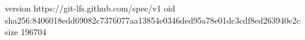 version https://git-lfs.github.com/spec/v1
oid sha256:8406018edd69082c7376077aa13854e0346ded95a78e01dc3cdf8ed263940e2c
size 196704
